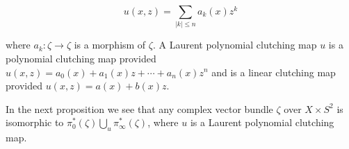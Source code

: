 $$u(x,z) = \sum_{|k| \leq n} a_k(x)z^k$$

where $a_k: \zeta \rightarrow \zeta$ is a morphism of $\zeta$. A Laurent polynomial clutching map $u$ is a polynomial clutching map provided $u(x,z) = a_0(x) + a_1(x)z + \cdots + a_n(x)z^n$ and is a linear clutching map provided $u(x,z) = a(x) + b(x)z$.

In the next proposition we see that any complex vector bundle $\zeta$ over $X \times S^2$ is isomorphic to $\pi_0^*(\zeta) \bigcup_u \pi_\infty^*(\zeta)$, where $u$ is a Laurent polynomial clutching map.
